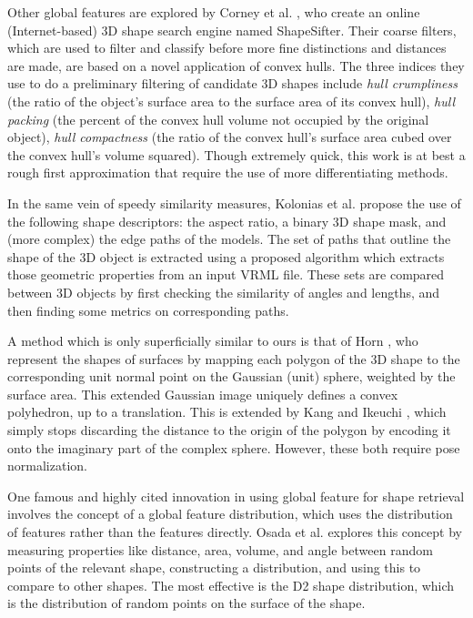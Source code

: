 \documentclass[../tech_report_1.tex]{subfiles}
\begin{document}
Other global features are explored by Corney et al. \cite{corney2002coarse}, who create an online (Internet-based) 3D shape search engine named ShapeSifter. Their coarse filters, which are used to filter and classify before more fine distinctions and distances are made, are based on a novel application of convex hulls. The three indices they use to do a preliminary filtering of candidate 3D shapes include \textit{hull crumpliness} (the ratio of the object's surface area to the surface area of its convex hull), \textit{hull packing} (the percent of the convex hull volume not occupied by the original object), \textit{hull compactness} (the ratio of the convex hull's surface area cubed over the convex hull's volume squared). Though extremely quick, this work is at best a rough first approximation that require the use of more differentiating methods.

In the same vein of speedy similarity measures, Kolonias et al. \cite{kolonias2005fast} propose the use of the following shape descriptors: the aspect ratio, a binary 3D shape mask, and (more complex) the edge paths of the models. The set of paths that outline the shape of the 3D object is extracted using a proposed algorithm which extracts those geometric properties from an input VRML file. These sets are compared between 3D objects by first checking the similarity of angles and lengths, and then finding some metrics on corresponding paths.

A method which is only superficially similar to ours is that of Horn \cite{horn1984extended}, who represent the shapes of surfaces by mapping each polygon of the 3D shape to the corresponding unit normal point on the Gaussian (unit) sphere, weighted by the surface area. This extended Gaussian image uniquely defines a convex polyhedron, up to a translation. This is extended by Kang and Ikeuchi \cite{kang1991determining}, which simply stops discarding the distance to the origin of the polygon by encoding it onto the imaginary part of the complex sphere. However, these both require pose normalization.

One famous and highly cited innovation in using global feature for shape retrieval involves the concept of a global feature distribution, which uses the distribution of features rather than the features directly. Osada et al. \cite{osada2002shape} explores this concept by measuring properties like distance, area, volume, and angle between random points of the relevant shape, constructing a distribution, and using this to compare to other shapes. The most effective is the D2 shape distribution, which is the distribution of random points on the surface of the shape.
\end{document}

